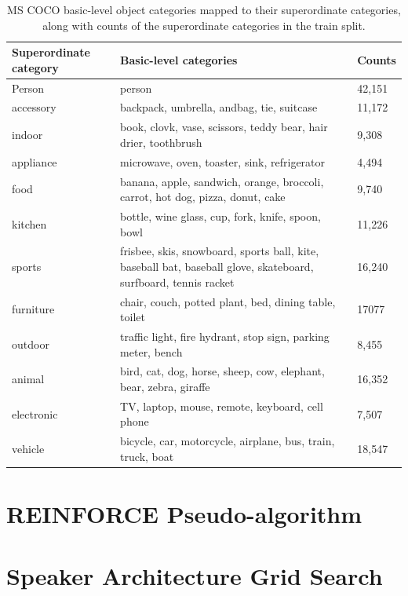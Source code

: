 \begin{table}[]
	\begin{tabularx}{\linewidth}{|X|X|l|}
		\hline
		\textbf{Superordinate category}                                    & \textbf{Basic-level categories} & \textbf{Counts}  \\ \hline
		Person & person & 42,151\\  \hline
		accessory & backpack, umbrella, andbag, tie, suitcase &11,172 \\  \hline
		indoor & book, clovk, vase, scissors, teddy bear, hair drier, toothbrush & 9,308\\  \hline
		appliance & microwave, oven, toaster, sink, refrigerator & 4,494 \\  \hline
		food & banana, apple, sandwich, orange, broccoli, carrot, hot dog, pizza, donut, cake & 9,740 \\  \hline
		kitchen & bottle, wine glass, cup, fork, knife, spoon, bowl & 11,226\\  \hline
		sports & frisbee, skis, snowboard, sports ball, kite, baseball bat, baseball glove, skateboard, surfboard, tennis racket &16,240 \\  \hline
		furniture & chair, couch, potted plant, bed, dining table, toilet & 17077\\  \hline
		outdoor & traffic light, fire hydrant, stop sign, parking meter, bench & 8,455\\  \hline
		animal & bird, cat, dog, horse, sheep, cow, elephant, bear, zebra, giraffe & 16,352\\  \hline
		electronic & TV, laptop, mouse, remote, keyboard, cell phone & 7,507 \\  \hline
		vehicle & bicycle, car, motorcycle, airplane, bus, train, truck, boat & 18,547\\ 
		\hline
	\end{tabularx}
	\caption{\label{tab:app_coco_categories} MS COCO basic-level object categories mapped to their superordinate categories, along with counts of the superordinate categories in the train split.}
\end{table}

\section{REINFORCE Pseudo-algorithm}

\section{Speaker Architecture Grid Search}
\label{app:grid_search}

